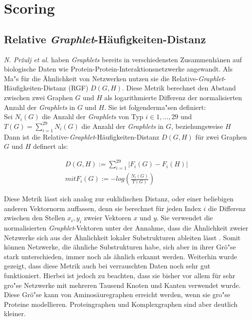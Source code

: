 \documentclass{report}
\begin{document}
\section{Scoring}





\subsection{Relative \textit{Graphlet}-H\"aufigkeiten-Distanz}

\textit{N. Pr\v{z}ulj et al.} haben \textit{Graphlets} bereits in verschiedensten Zusammenh\"anen auf biologische Daten wie Protein-Protein-Interaktionsnetzwerke \cite{frqdistribution} angewandt. Als Ma"s f\"ur die \"Ahnlichkeit von Netzwerken nutzen sie die Relative-\textit{Graphlet}-H\"aufigkeiten-Distanz (RGF) $D(G,H)$. Diese Metrik berechnet den Abstand zwischen zwei Graphen $G$ und $H$ als logarithmierte Differenz der normalisierten Anzahl der \textit{Graphlets} in $G$ und $H$. Sie ist folgenderma"sen definiert: \\

Sei $N_{i}(G)$ die Anzahl der \textit{Graphlets} von Typ $i \in {1,...,29}$ und \\ $T(G) = \sum_{i = 1}^{29} N_{i}(G)$ die Anzahl der \textit{Graphlets} in $G$, beziehungsweise $H$\\

Dann ist die Relative-\textit{Graphlet}-H\"aufigkeiten-Distanz $D(G,H)$ f\"ur zwei Graphen $G$ und $H$ definert als:

\begin{subequations}
\begin{align}
D(G,H) := \sum_{i = 1}^{29} | F_{i}(G) - F_{i}(H) | \\
mit F_{i}(G) := - log(\frac{N_{i}(G)}{T(G)})
\end{align}
\end{subequations}



Diese Metrik l\"asst sich analog zur euklidischen Distanz, oder einer beliebigen anderen Vektornorm auffassen, denn sie berechnet f\"ur jeden Index $i$ die Differenz zwischen den Stellen $x_i,y_i$ zweier Vektoren $x$ und $y$. Sie verwendet die normalisierten \textit{Graphlet}-Vektoren unter der Annahme, dass die \"Ahnlichkeit zweier Netzwerke sich aus der \"Ahnlichkeit lokaler Substrukturen ableiten l\"asst \cite{frqdistribution}. Somit k\"onnen Netzwerke, die \"ahnliche Substrukturen habe, sich aber in ihrer Gr\"o"se stark unterschieden, immer noch als \"ahnlich erkannt werden.
Weiterhin wurde gezeigt, \cite{frqdistribution} dass diese Metrik auch bei verrauschten Daten noch sehr gut funktioniert. Hierbei ist jedoch zu beachten, dass sie bisher vor allem f\"ur sehr gro"se Netzwerke mit mehreren Tausend Knoten und Kanten verwendet wurde. Diese Gr\"o"se kann von Aminos\"auregraphen erreicht werden, wenn sie gro"se Proteine modellieren. Proteingraphen und Komplexgraphen sind aber deutlich kleiner.
\end{document}
